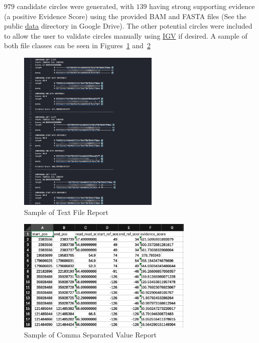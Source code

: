 \documentclass[11pt, letterpaper]{article}
\begin{document}
$979$ candidate circles were generated, with $139$ having strong supporting evidence (a positive Evidence Score) using the provided BAM and FASTA files (See the public \href{https://drive.google.com/drive/folders/1WYPwCzSv__28iQlHwvZUZpNlmjTM7Fea}{data} directory in Google Drive). The other potential circles were included to allow the user to validate circles manually using \href{https://igv.org/}{IGV} if desired. A sample of both file classes can be seen in Figures~\ref{fig:txt_ex} and~\ref{fig:csv}

\begin{figure}[H]
\centering
\includegraphics[width=0.6\textwidth]{imgs/txt_ex.png}
\caption{Sample of Text File Report}
\label{fig:txt_ex}
\end{figure}

\begin{figure}[H]
\centering
\includegraphics[width=0.75\textwidth]{imgs/csv_ex.png}
\caption{Sample of Comma Separated Value Report}
\label{fig:csv}
\end{figure}
\end{document}
